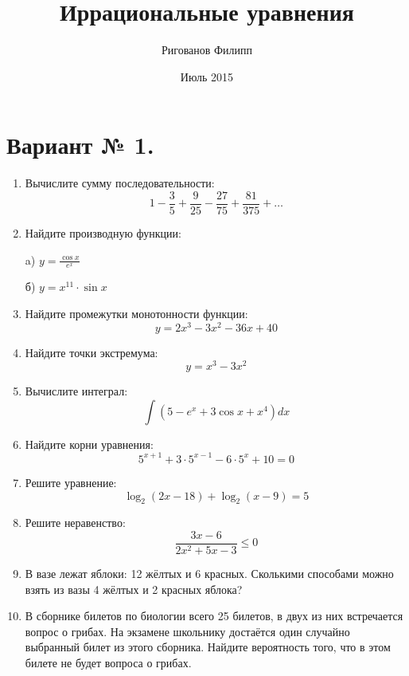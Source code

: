 \documentclass{article}
\title{Иррациональные уравнения}
\author{Ригованов Филипп}
\date{Июль 2015}
\begin{document}
\maketitle
\section*{Вариант № 1.}
\begin{enumerate}

\item %
Вычислите сумму последовательности:
$$1-\frac{3}{5}+\frac{9}{25}-\frac{27}{75}+\frac{81}{375}+\ldots$$
\item %
Найдите производную функции:

a) $y=\frac{\cos{x}}{e^x}$

б) $y=x^{11}\cdot\sin{x}$

\item %
Найдите промежутки монотонности функции:
$$y=2x^3-3x^2-36x+40$$

\item %
Найдите точки экстремума:
$$y=x^3-3x^2$$

\item %
Вычислите интеграл:
$$\int{\left(5-e^x+3\cos{x}+x^4\right)dx}$$

\item %
Найдите корни уравнения:
$$5^{x+1}+3\cdot5^{x-1}-6\cdot5^x+10=0$$

\item %
Решите уравнение:
$$\log_2{(2x-18)}+\log_2{(x-9)}=5$$

\item %
Решите неравенство:
$$\frac{3x-6}{2x^2+5x-3}\leq0$$

\item %
В вазе лежат яблоки: 12 жёлтых и 6 красных. Сколькими способами можно взять из вазы 4 жёлтых и 2 красных яблока?

\item %
В сборнике билетов по биологии всего 25 билетов, в двух из них встречается вопрос о грибах. На экзамене школьнику достаётся один случайно выбранный билет из этого сборника. Найдите вероятность того, что в этом билете не будет вопроса о грибах.

\end{enumerate}
\end{document}
